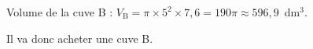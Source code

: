 \medskip

%
%
% 
% 
% 
 
Volume de la cuve B : $V_{\text{B}} = \pi \times  5^2 \times 7,6 = 190\pi \approx 596,9$~dm$^3$. 

Il va donc acheter une cuve B.
\vspace{0,5cm}


